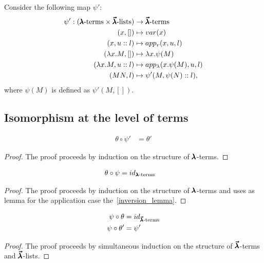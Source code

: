 \begin{definition}
  Consider the following map $\psi'$:
  \begin{align*}
    \psi' : (\pmb{\lambda} \text{-terms} \times \pmb{\vec \lambda} \text{-lists}) &\to \pmb{\vec \lambda} \text{-terms} \\
    (x, []) &\mapsto var(x) \\
    (x, u::l) &\mapsto app_v (x, u, l) \\
    (\lambda x . M, []) &\mapsto \lambda x . \psi(M) \\
    (\lambda x . M, u::l) &\mapsto app_\lambda (x . \psi(M), u, l) \\
    (M N, l) &\mapsto \psi'(M, \psi(N)::l),              
  \end{align*}
  where $\psi(M)$ is defined as $\psi'(M, [])$.
\end{definition}

\subsection{Isomorphism at the level of terms}

\begin{lemma}
  \label{inversion_lemma}
  \begin{align*}
    \theta \circ \psi' &= \theta'    
  \end{align*}
\end{lemma}
\begin{proof}
  The proof proceeds by induction on the structure of $\pmb{\lambda}$-terms.
\end{proof}


\begin{theorem}
  \label{theorem7}
  \begin{align*}
    \theta \circ \psi &= id_{\pmb{\lambda} \text{-terms}}
  \end{align*}
\end{theorem}
\begin{proof}
  The proof proceeds by induction on the structure of $\pmb{\lambda}$-terms and uses as lemma for the application case the~\cref{inversion_lemma}.
\end{proof}


\begin{theorem}
  \label{theorem8}
  \begin{align*}
    \psi \circ \theta &= id_{\pmb{\vec \lambda} \text{-terms}} \\
    \psi \circ \theta' &= \psi'    
  \end{align*}
\end{theorem}
\begin{proof}
  The proof proceeds by simultaneous induction on the structure of $\pmb{\vec \lambda}$-terms and $\pmb{\vec \lambda}$-lists.
\end{proof}



